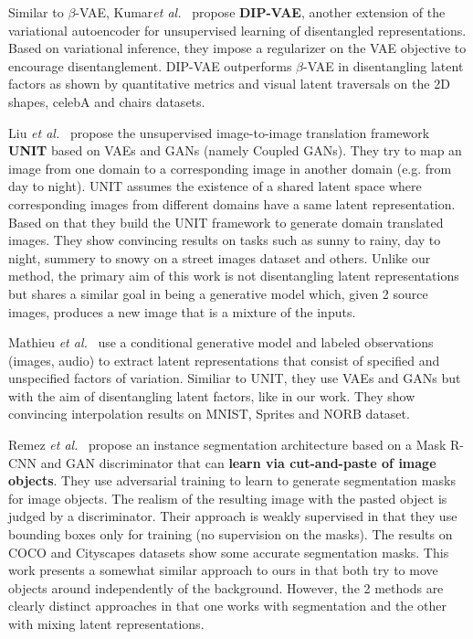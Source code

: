 \documentclass[a4paper,12pt]{report}
\begin{document}
Similar to $\beta$-VAE, Kumar\textit{et al.}~\cite{DIPVAE} propose \textbf{DIP-VAE}, another extension of the variational autoencoder for unsupervised learning of disentangled representations. Based on variational inference, they impose a regularizer on the VAE objective to encourage disentanglement. DIP-VAE outperforms $\beta$-VAE in disentangling latent factors as shown by quantitative metrics and visual latent traversals on the 2D shapes, celebA and chairs datasets.

Liu \textit{et al.}~\cite{UNIT} propose the unsupervised image-to-image translation framework \textbf{UNIT} based on VAEs and GANs (namely Coupled GANs). They try to map an image from one domain to a corresponding image in another domain (e.g. from day to night). UNIT assumes the existence of a shared latent space where corresponding images from different domains have a same latent representation. Based on that they build the UNIT framework to generate domain translated images. They show convincing results on tasks such as sunny to rainy, day to night, summery to snowy on a street images dataset and others. Unlike our method, the primary aim of this work is not disentangling latent representations but shares a similar goal in being a generative model which, given 2 source images, produces a new image that is a mixture of the inputs.

Mathieu \textit{et al.}~\cite{1611.03383} use a conditional generative model and labeled observations (images, audio) to extract latent representations that consist of specified and unspecified factors of variation. Similiar to UNIT, they use VAEs and GANs but with the aim of disentangling latent factors, like in our work. They show convincing interpolation results on MNIST, Sprites and NORB dataset.

Remez \textit{et al.}~\cite{CutAndPaste} propose an instance segmentation architecture based on a Mask R-CNN and GAN discriminator that can \textbf{learn via cut-and-paste of image objects}. They use adversarial training to learn to generate segmentation masks for image objects. The realism of the resulting image with the pasted object is judged by a discriminator. Their approach is weakly supervised in that they use bounding boxes only for training (no supervision on the masks). The results on COCO and Cityscapes datasets show some accurate segmentation masks. This work presents a somewhat similar approach to ours in that both try to move objects around independently of the background. However, the 2 methods are clearly distinct approaches in that one works with segmentation and the other with mixing latent representations.
\end{document}
